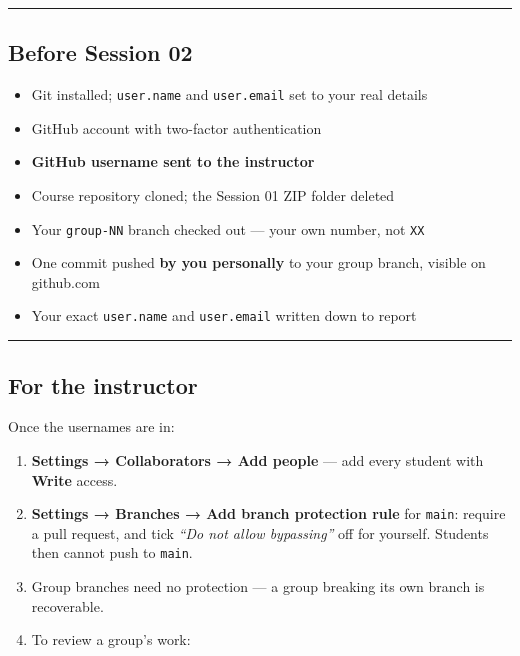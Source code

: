 \documentclass[
  letterpaper,
  10pt,
  twoside,
  openright,
  numbers=noenddot,
  chapterprefix=true]{scrbook}
\providecommand{\tightlist}{%
  \setlength{\itemsep}{0pt}\setlength{\parskip}{0pt}}
\begin{document}
\begin{center}\rule{0.5\linewidth}{0.5pt}\end{center}

\subsection{Before Session 02}\label{before-session-02}

\begin{itemize}
\tightlist
\item[$\square$]
  Git installed; \texttt{user.name} and \texttt{user.email} set to your
  real details
\item[$\square$]
  GitHub account with two-factor authentication
\item[$\square$]
  \textbf{GitHub username sent to the instructor}
\item[$\square$]
  Course repository cloned; the Session 01 ZIP folder deleted
\item[$\square$]
  Your \texttt{group-NN} branch checked out --- your own number, not
  \texttt{XX}
\item[$\square$]
  One commit pushed \textbf{by you personally} to your group branch,
  visible on github.com
\item[$\square$]
  Your exact \texttt{user.name} and \texttt{user.email} written down to
  report
\end{itemize}

\begin{center}\rule{0.5\linewidth}{0.5pt}\end{center}

\subsection{For the instructor}\label{for-the-instructor}

Once the usernames are in:

\begin{enumerate}
\def\labelenumi{\arabic{enumi}.}
\tightlist
\item
  \textbf{Settings → Collaborators → Add people} --- add every student
  with \textbf{Write} access.
\item
  \textbf{Settings → Branches → Add branch protection rule} for
  \texttt{main}: require a pull request, and tick \emph{``Do not allow
  bypassing''} off for yourself. Students then cannot push to
  \texttt{main}.
\item
  Group branches need no protection --- a group breaking its own branch
  is recoverable.
\item
  To review a group's work:
\end{enumerate}
\end{document}
